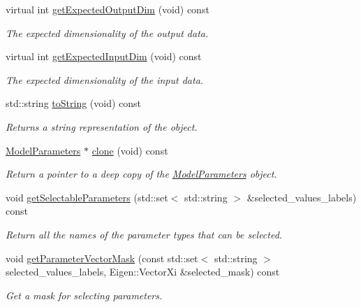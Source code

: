 \begin{DoxyCompactItemize}
\item 
virtual int \hyperlink{classDmpBbo_1_1ModelParametersGMR_ab1a7cb7c0bf6fe5afd5561fa6f27ba7b}{get\+Expected\+Output\+Dim} (void) const 
\begin{DoxyCompactList}\small\item\em The expected dimensionality of the output data. \end{DoxyCompactList}\item 
virtual int \hyperlink{classDmpBbo_1_1ModelParametersGMR_a2dadd5878cbb2d453e311d8d1adb314c}{get\+Expected\+Input\+Dim} (void) const 
\begin{DoxyCompactList}\small\item\em The expected dimensionality of the input data. \end{DoxyCompactList}\item 
std\+::string \hyperlink{classDmpBbo_1_1ModelParametersGMR_a1aca816b42cf0d36118be0ab91120d77}{to\+String} (void) const 
\begin{DoxyCompactList}\small\item\em Returns a string representation of the object. \end{DoxyCompactList}\item 
\hyperlink{classDmpBbo_1_1ModelParameters}{Model\+Parameters} $\ast$ \hyperlink{classDmpBbo_1_1ModelParametersGMR_a0a71d403a2e0560e058c03394648d773}{clone} (void) const 
\begin{DoxyCompactList}\small\item\em Return a pointer to a deep copy of the \hyperlink{classDmpBbo_1_1ModelParameters}{Model\+Parameters} object. \end{DoxyCompactList}\item 
void \hyperlink{classDmpBbo_1_1ModelParametersGMR_a887f4747734bd8b7cc4f799092ff31b4}{get\+Selectable\+Parameters} (std\+::set$<$ std\+::string $>$ \&selected\+\_\+values\+\_\+labels) const 
\begin{DoxyCompactList}\small\item\em Return all the names of the parameter types that can be selected. \end{DoxyCompactList}\item 
void \hyperlink{classDmpBbo_1_1ModelParametersGMR_a9dba1f93e426e7511630ec1ece4ace17}{get\+Parameter\+Vector\+Mask} (const std\+::set$<$ std\+::string $>$ selected\+\_\+values\+\_\+labels, Eigen\+::\+Vector\+Xi \&selected\+\_\+mask) const 
\begin{DoxyCompactList}\small\item\em Get a mask for selecting parameters. \end{DoxyCompactList}\item 

\end{DoxyCompactItemize}
